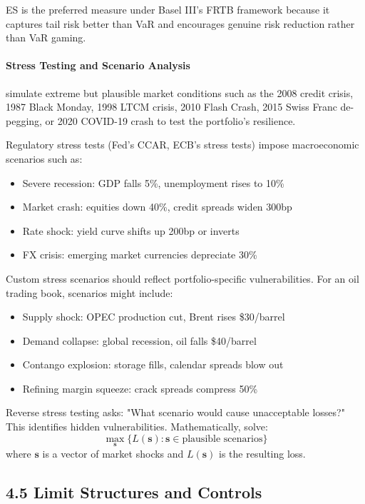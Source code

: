 \documentclass[11pt,a4paper]{article}
\begin{document}
ES is the preferred measure under Basel III's FRTB framework because it captures tail risk better than VaR and encourages genuine risk reduction rather than VaR gaming.

\paragraph{Stress Testing and Scenario Analysis} simulate extreme but plausible market conditions such as the 2008 credit crisis, 1987 Black Monday, 1998 LTCM crisis, 2010 Flash Crash, 2015 Swiss Franc de-pegging, or 2020 COVID-19 crash to test the portfolio's resilience.

Regulatory stress tests (Fed's CCAR, ECB's stress tests) impose macroeconomic scenarios such as:
\begin{itemize}
    \item Severe recession: GDP falls 5\%, unemployment rises to 10\%
    \item Market crash: equities down 40\%, credit spreads widen 300bp
    \item Rate shock: yield curve shifts up 200bp or inverts
    \item FX crisis: emerging market currencies depreciate 30\%
\end{itemize}

Custom stress scenarios should reflect portfolio-specific vulnerabilities. For an oil trading book, scenarios might include:
\begin{itemize}
    \item Supply shock: OPEC production cut, Brent rises \$30/barrel
    \item Demand collapse: global recession, oil falls \$40/barrel
    \item Contango explosion: storage fills, calendar spreads blow out
    \item Refining margin squeeze: crack spreads compress 50\%
\end{itemize}

Reverse stress testing asks: "What scenario would cause unacceptable losses?" This identifies hidden vulnerabilities. Mathematically, solve:
\[
\max_{\mathbf{s}} \{L(\mathbf{s}) : \mathbf{s} \in \text{plausible scenarios}\}
\]
where $\mathbf{s}$ is a vector of market shocks and $L(\mathbf{s})$ is the resulting loss.

\subsection*{4.5 Limit Structures and Controls}
\end{document}
